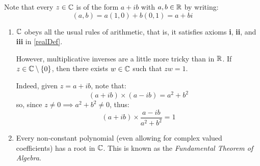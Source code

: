 \documentclass[../main.tex]{subfiles}
\begin{document}
Note that every $z \in \mathbb{C}$ is of the form $a + ib$ with $a, b \in \mathbb{R}$ by writing:
\[
  (a, b) = a(1, 0) + b(0, 1) = a + bi
\]
\begin{remark}[Remarks]
  \begin{enumerate}
    \item $\mathbb{C}$ obeys all the usual rules of arithmetic, that is, it satisfies axioms \textbf{i}, \textbf{ii}, and \textbf{iii} in \cref{realDef}.

      However, multiplicative inverses are a little more tricky than in $\mathbb{R}$.
      If $z \in \mathbb{C} \setminus \{0\}$, then there exists $w \in \mathbb{C}$ such that $zw = 1$.

      Indeed, given $z = a + ib$, note that:
      \[
        (a + ib) \times (a - ib) = a^2 + b^2
      \]
      so, since $z \neq 0 \implies a^2 + b^2 \neq 0$, thus:
      \[
        (a + ib) \times \frac{a - ib}{a^2 + b^2} = 1
      \]
    \item Every non-constant polynomial (even allowing for complex valued coefficients) has a root in $\mathbb{C}$.
      This is known as the \textit{Fundamental Theorem of Algebra}.
  \end{enumerate}
\end{remark}
\end{document}
